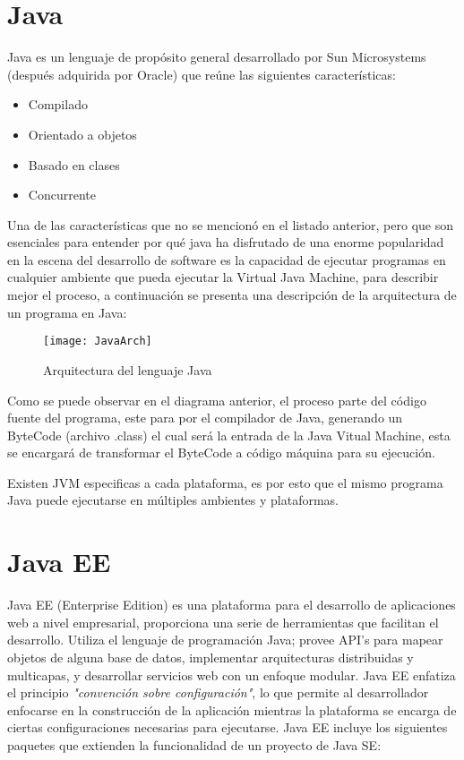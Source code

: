 \section{Java}
Java es un lenguaje de propósito general desarrollado por Sun Microsystems (después adquirida por Oracle) que reúne las siguientes características:
\begin{itemize}
 \item Compilado
 \item Orientado a objetos
 \item Basado en clases
 \item Concurrente 
\end{itemize}

Una de las características que no se mencionó en el listado anterior, pero que son esenciales para entender por qué java ha disfrutado de una enorme popularidad en la escena del desarrollo de software es la capacidad de ejecutar programas en cualquier ambiente que pueda ejecutar la Virtual Java Machine, para describir mejor el proceso, a continuación se presenta una descripción de la arquitectura de un programa en Java:
\begin{figure}[H]
  \begin{center}
    \texttt{[image: JavaArch]}
  \end{center}
  \caption{Arquitectura del lenguaje Java}
\end{figure}

Como se puede observar en el diagrama anterior, el proceso parte del código fuente del programa, este para por el compilador de Java, generando un ByteCode (archivo .class) el cual será la entrada de la Java Vitual Machine, esta se encargará de transformar el ByteCode a código máquina para su ejecución.

Existen JVM especificas a cada plataforma, es por esto que el mismo programa Java puede ejecutarse en múltiples ambientes y plataformas.


\section{Java EE}
Java EE (Enterprise Edition) es una plataforma para el desarrollo de aplicaciones web a nivel empresarial, proporciona una serie de herramientas que facilitan el desarrollo.
Utiliza el lenguaje de programación Java; provee API's para mapear objetos de alguna base de datos, implementar arquitecturas distribuidas y multicapas, y desarrollar servicios web con un enfoque modular.
Java EE enfatiza el principio \textit{"convención sobre configuración"}, lo que permite al desarrollador enfocarse en la construcción de la aplicación mientras la plataforma se encarga de ciertas configuraciones necesarias para ejecutarse.
Java EE incluye los siguientes paquetes que extienden la funcionalidad de un proyecto de Java SE:

